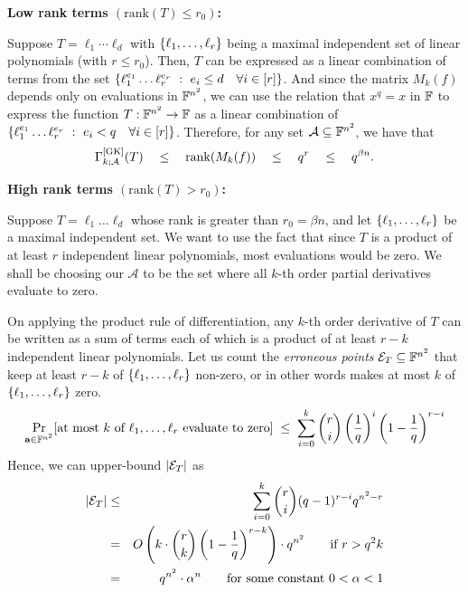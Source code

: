 \noindent 
{\bf Low rank terms $(\mathrm{rank}(T) \leq r_0)$:}

Suppose $T = \ell_1 \cdots \ell_d$ with $\left\{\ell_1, \dots,
  \ell_r\right\}$ being a maximal independent set of linear polynomials (with
$r \leq r_0$). Then, $T$ can be expressed as a linear combination of
terms from the set $\left\{{\ell_1^{e_1}\dots \ell_r^{e_r}}\ : \ {e_i\leq d
  \quad \forall i\in [r]}\right\}$. And since the matrix $M_k(f)$ depends only
on evaluations in $\mathbb{F}^{n^2}$, we can use the relation that $x^q = x$
in $\mathbb{F}$ to express the function $T:\mathbb{F}^{n^2}\rightarrow \mathbb{F}$ as a linear
combination of $\left\{{\ell_1^{e_1}\dots \ell_r^{e_r}}\ : \ {e_i<q \quad
  \forall i\in [r]}\right\}$. Therefore, for any set $\mathcal{A}\subseteq
\mathbb{F}^{n^2}$, we have that
$$
\Gamma^{\mathrm{[GK]}}_{k;\mathcal{A}}(T) \quad \leq \quad
\mathrm{rank}(M_k(f)) \quad \leq \quad q^r \quad\leq \quad q^{\beta{n}}.
$$


\noindent
{\bf High rank terms $(\mathrm{rank}(T) > r_0)$:}

Suppose $T = \ell_1\dots \ell_d$ whose rank is greater than $r_0 =
\beta n$, and let $\left\{\ell_1, \dots, \ell_r\right\}$ be a maximal
independent set. We want to use the fact that since $T$ is a product
of at least $r$ independent linear polynomials, most evaluations would
be zero. We shall be choosing our $\mathcal{A}$ to be the set where
all $k$-th order partial derivatives evaluate to zero.

On applying the product rule of differentiation, any $k$-th order
derivative of $T$ can be written as a sum of terms each of which is a
product of at least $r-k$ independent linear polynomials. Let us count
the \emph{erroneous points} $\mathcal{E}_T\subseteq \mathbb{F}^{n^2}$ that
keep at least $r-k$ of $\left\{\ell_1,\dots, \ell_r\right\}$ non-zero, or
in other words makes at most $k$ of $\left\{\ell_1,\dots, \ell_r\right\}$
zero.
$$
\Pr_{\mathbf{a}\in \mathbb{F}^{n^2}}[\text{at most $k$ of $\ell_1,\dots,
  \ell_r$ evaluate to zero}] \;\leq \; \sum_{i=0}^k \binom{r}{i}
\left(\frac{1}{q}\right)^i\left(1 - \frac{1}{q}\right)^{r-i}
$$
Hence, we can upper-bound $\left|\mathcal{E}_T\right|$ as
\begin{eqnarray*}
\left|\mathcal{E}_T\right| &\leq & \sum_{i=0}^k \binom{r}{i} (q-1)^{r-i}q^{n^2 - r}\\
 & = & O\left(k\cdot \binom{r}{k}\left(1 - \frac{1}{q}\right)^{r-k}\right) \cdot  q^{n^2} \qquad\text{if $r > q^2 k$}\\
 & = & q^{n^2} \cdot \alpha^n \qquad\text{for some constant $0 < \alpha < 1$}\\
 \end{eqnarray*}

